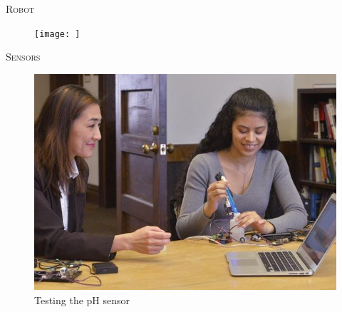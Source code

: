 \documentclass[final,t]{beamer}
\begin{document}
\begin{frame}{}
\begin{columns}[t]
            \begin{column}{.5\linewidth}

                \begin{block}{\textsc{Robot}}
                    \vspace*{6mm}
                    \begin{figure}
                        \texttt{[image: ]}
                        \caption{}
                    \end{figure}
                \end{block}

                \begin{block}{\textsc{Sensors}}
                    \vspace*{6mm}
                    \begin{figure}
                        \includegraphics[scale = 2.5]{assets/testingsensor.jpg}
                        \caption{Testing the pH sensor}
                    \end{figure}
                \end{block}


\end{column}
\end{columns}
\end{frame}
\end{document}

